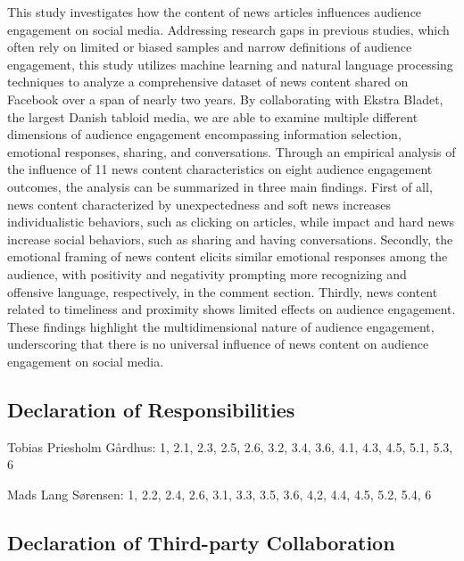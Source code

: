 \documentclass[
]{article}
\begin{document}
This study investigates how the content of news articles influences
audience engagement on social media. Addressing research gaps in
previous studies, which often rely on limited or biased samples and
narrow definitions of audience engagement, this study utilizes machine
learning and natural language processing techniques to analyze a
comprehensive dataset of news content shared on Facebook over a span of
nearly two years. By collaborating with Ekstra Bladet, the largest
Danish tabloid media, we are able to examine multiple different
dimensions of audience engagement encompassing information selection,
emotional responses, sharing, and conversations. Through an empirical
analysis of the influence of 11 news content characteristics on eight
audience engagement outcomes, the analysis can be summarized in three
main findings. First of all, news content characterized by
unexpectedness and soft news increases individualistic behaviors, such
as clicking on articles, while impact and hard news increase social
behaviors, such as sharing and having conversations. Secondly, the
emotional framing of news content elicits similar emotional responses
among the audience, with positivity and negativity prompting more
recognizing and offensive language, respectively, in the comment
section. Thirdly, news content related to timeliness and proximity shows
limited effects on audience engagement. These findings highlight the
multidimensional nature of audience engagement, underscoring that there
is no universal influence of news content on audience engagement on
social media.

\hypertarget{declaration-of-responsibilities}{%
\subsection*{Declaration of
Responsibilities}\label{declaration-of-responsibilities}}

Tobias Priesholm Gårdhus: 1, 2.1, 2.3, 2.5, 2.6, 3.2, 3.4, 3.6, 4.1,
4.3, 4.5, 5.1, 5.3, 6

\noindent Mads Lang Sørensen: 1, 2.2, 2.4, 2.6, 3.1, 3.3, 3.5, 3.6, 4,2,
4.4, 4.5, 5.2, 5.4, 6

\hypertarget{declaration-of-third-party-collaboration}{%
\subsection*{Declaration of Third-party
Collaboration}\label{declaration-of-third-party-collaboration}}
\end{document}
